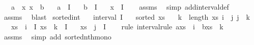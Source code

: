 \begin{isabellebody}
\ \ \ {\isachardoublequoteopen}a\ {\isasymle}\ x{\isachardoublequoteclose}\ {\isachardoublequoteopen}x\ {\isasymle}\ b{\isachardoublequoteclose}\isanewline
\ \ \ {\isachardoublequoteopen}a\ {\isasymin}\ I{\isachardoublequoteclose}\isanewline
\ \ \ {\isachardoublequoteopen}b\ {\isasymin}\ I{\isachardoublequoteclose}\isanewline
\ \ \ {\isachardoublequoteopen}x\ {\isasymin}\ I{\isachardoublequoteclose}\isanewline
%
\isadelimproof
\ \ %
\endisadelimproof
%
\isatagproof
{}\isamarkupfalse%
\ assms{\isacharparenleft}{\kern0pt}{}{\isacharparenright}{\kern0pt}\ \isamarkupfalse%
\ {\isacharparenleft}{\kern0pt}simp\ add{\isacharcolon}{\kern0pt}interval{\isacharunderscore}{\kern0pt}def{\isacharparenright}{\kern0pt}\isanewline
\ \ \isamarkupfalse%
\ assms\ \isamarkupfalse%
\ blast%
\endisatagproof
{\isafoldproof}%
%
\isadelimproof
\isanewline
%
\endisadelimproof
\isanewline
{}\isamarkupfalse%
\ sorted{\isacharunderscore}{\kern0pt}int{\isacharcolon}{\kern0pt}\isanewline
\ \ \ {\isachardoublequoteopen}interval\ I{\isachardoublequoteclose}\isanewline
\ \ \ {\isachardoublequoteopen}sorted\ xs{\isachardoublequoteclose}\isanewline
\ \ \ {\isachardoublequoteopen}k\ {\isacharless}{\kern0pt}\ length\ xs{\isachardoublequoteclose}\ {\isachardoublequoteopen}i\ {\isasymle}\ j{\isachardoublequoteclose}\ {\isachardoublequoteopen}j\ {\isasymle}\ k\ {\isachardoublequoteclose}\isanewline
\ \ \ {\isachardoublequoteopen}xs\ {\isacharbang}{\kern0pt}\ i\ {\isasymin}\ I{\isachardoublequoteclose}\ {\isachardoublequoteopen}xs\ {\isacharbang}{\kern0pt}\ k\ {\isasymin}\ I{\isachardoublequoteclose}\isanewline
\ \ \ {\isachardoublequoteopen}xs\ {\isacharbang}{\kern0pt}\ j\ {\isasymin}\ I{\isachardoublequoteclose}\isanewline
%
\isadelimproof
\ \ %
\endisadelimproof
%
\isatagproof
{}\isamarkupfalse%
\ {\isacharparenleft}{\kern0pt}rule\ interval{\isacharunderscore}{\kern0pt}rule{\isacharbrackleft}{\kern0pt}\ a{\isacharequal}{\kern0pt}{\isachardoublequoteopen}xs\ {\isacharbang}{\kern0pt}\ i{\isachardoublequoteclose}\ \ b{\isacharequal}{\kern0pt}{\isachardoublequoteopen}xs\ {\isacharbang}{\kern0pt}\ k{\isachardoublequoteclose}{\isacharbrackright}{\kern0pt}{\isacharparenright}{\kern0pt}\isanewline
\ \ \isamarkupfalse%
\ assms\ \isamarkupfalse%
\ {\isacharparenleft}{\kern0pt}simp\ add{\isacharcolon}{\kern0pt}\ sorted{\isacharunderscore}{\kern0pt}nth{\isacharunderscore}{\kern0pt}mono{\isacharparenright}{\kern0pt}{\isacharplus}{\kern0pt}%

\end{isabellebody}
